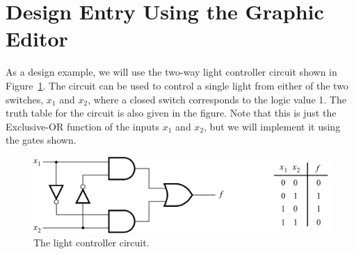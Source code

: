 \documentclass[11pt, twoside, pdftex]{article}
\begin{document}


{\tiny \tableofcontents}
\newpage












\section{Design Entry Using the Graphic Editor}

\noindent
As a design example, we will use the two-way light controller circuit shown in 
Figure~\ref{fig:11}. The circuit can be used to control a single light from either of the
two switches, $x_1$ and $x_2$, where a closed switch corresponds to the logic value 1.
The truth table for the circuit is also given in the figure. Note that
this is just the Exclusive-OR function of the inputs $x_1$ and $x_2$,
but we will implement it using the gates shown.
 
\begin{figure}[H]
   \begin{center}
      \includegraphics[scale=1]{figures/figure11.png}
   \caption{The light controller circuit.} 
	 \label{fig:11}
	 \end{center}
\end{figure}
\end{document}
